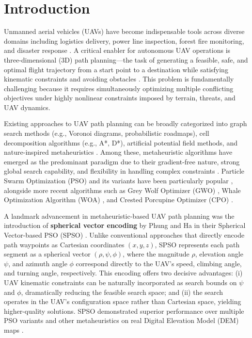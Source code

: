 \section{Introduction}

Unmanned aerial vehicles (UAVs) have become indispensable tools across diverse domains including logistics delivery, power line inspection, forest fire monitoring, and disaster response \cite{icpo2024,qcpo2025,jayacpo2025}. A critical enabler for autonomous UAV operations is three-dimensional (3D) path planning—the task of generating a feasible, safe, and optimal flight trajectory from a start point to a destination while satisfying kinematic constraints and avoiding obstacles \cite{sps2021}. This problem is fundamentally challenging because it requires simultaneously optimizing multiple conflicting objectives under highly nonlinear constraints imposed by terrain, threats, and UAV dynamics.

Existing approaches to UAV path planning can be broadly categorized into graph search methods (e.g., Voronoi diagrams, probabilistic roadmaps), cell decomposition algorithms (e.g., A*, D*), artificial potential field methods, and nature-inspired metaheuristics \cite{sps2021}. Among these, metaheuristic algorithms have emerged as the predominant paradigm due to their gradient-free nature, strong global search capability, and flexibility in handling complex constraints \cite{icpo2024,multiicpo2026}. Particle Swarm Optimization (PSO) and its variants have been particularly popular \cite{sps2021}, alongside more recent algorithms such as Grey Wolf Optimizer (GWO) \cite{gwo2014}, Whale Optimization Algorithm (WOA) \cite{woa2016}, and Crested Porcupine Optimizer (CPO) \cite{cpo2024}.

A landmark advancement in metaheuristic-based UAV path planning was the introduction of \textbf{spherical vector encoding} by Phung and Ha in their Spherical Vector-based PSO (SPSO) \cite{sps2021}. Unlike conventional approaches that directly encode path waypoints as Cartesian coordinates $(x, y, z)$, SPSO represents each path segment as a spherical vector $(\rho, \psi, \phi)$, where the magnitude $\rho$, elevation angle $\psi$, and azimuth angle $\phi$ correspond directly to the UAV's speed, climbing angle, and turning angle, respectively. This encoding offers two decisive advantages: (i) UAV kinematic constraints can be naturally incorporated as search bounds on $\psi$ and $\phi$, dramatically reducing the feasible search space; and (ii) the search operates in the UAV's configuration space rather than Cartesian space, yielding higher-quality solutions. SPSO demonstrated superior performance over multiple PSO variants and other metaheuristics on real Digital Elevation Model (DEM) maps \cite{sps2021}.

